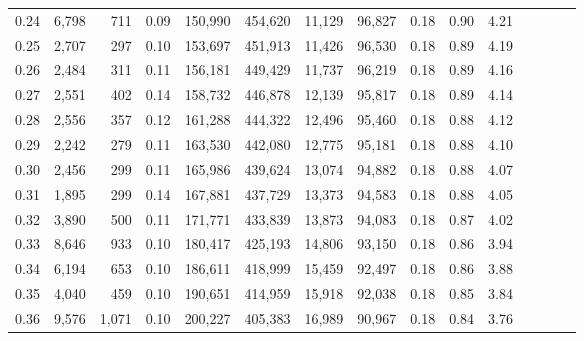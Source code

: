 \begin{tabular}{rrrcrrrrrrrrrrr}
0.24 &   6,798 &    711 &                                       0.09 &  150,990 &  454,620 &   11,129 &   96,827 &  0.18 &  0.90 &                         4.21 \\
0.25 &   2,707 &    297 &                                       0.10 &  153,697 &  451,913 &   11,426 &   96,530 &  0.18 &  0.89 &                         4.19 \\
0.26 &   2,484 &    311 &                                       0.11 &  156,181 &  449,429 &   11,737 &   96,219 &  0.18 &  0.89 &                         4.16 \\
0.27 &   2,551 &    402 &                                       0.14 &  158,732 &  446,878 &   12,139 &   95,817 &  0.18 &  0.89 &                         4.14 \\
0.28 &   2,556 &    357 &                                       0.12 &  161,288 &  444,322 &   12,496 &   95,460 &  0.18 &  0.88 &                         4.12 \\
0.29 &   2,242 &    279 &                                       0.11 &  163,530 &  442,080 &   12,775 &   95,181 &  0.18 &  0.88 &                         4.10 \\
0.30 &   2,456 &    299 &                                       0.11 &  165,986 &  439,624 &   13,074 &   94,882 &  0.18 &  0.88 &                         4.07 \\
0.31 &   1,895 &    299 &                                       0.14 &  167,881 &  437,729 &   13,373 &   94,583 &  0.18 &  0.88 &                         4.05 \\
0.32 &   3,890 &    500 &                                       0.11 &  171,771 &  433,839 &   13,873 &   94,083 &  0.18 &  0.87 &                         4.02 \\
0.33 &   8,646 &    933 &                                       0.10 &  180,417 &  425,193 &   14,806 &   93,150 &  0.18 &  0.86 &                         3.94 \\
0.34 &   6,194 &    653 &                                       0.10 &  186,611 &  418,999 &   15,459 &   92,497 &  0.18 &  0.86 &                         3.88 \\
0.35 &   4,040 &    459 &                                       0.10 &  190,651 &  414,959 &   15,918 &   92,038 &  0.18 &  0.85 &                         3.84 \\
0.36 &   9,576 &  1,071 &                                       0.10 &  200,227 &  405,383 &   16,989 &   90,967 &  0.18 &  0.84 &                         3.76 \\

\end{tabular}
